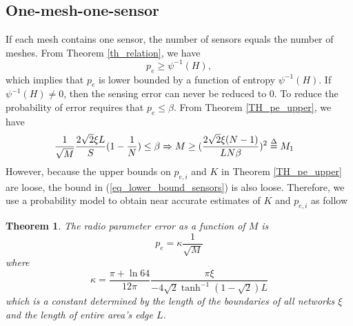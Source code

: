 \documentclass[conference]{IEEEtran}
\newtheorem{Theo}{Theorem}
\begin{document}
\subsection{One-mesh-one-sensor}
If each mesh contains one sensor, the number of sensors equals the number of meshes.
From Theorem \ref{th_relation}, we have
\begin{equation}
p_e \ge {\psi ^{ - 1}}(H),
\end{equation}
which implies that $p_e$ is lower bounded by a function of entropy ${\psi ^{ - 1}}(H)$.
If ${\psi ^{ - 1}}(H) \ne 0$, then the sensing error can never be reduced to $0$.
To reduce the probability of error requires that ${p_e} \le \beta$.
From Theorem \ref{TH_pe_upper}, we have
\begin{equation}\label{eq_lower_bound_sensors}
\begin{aligned}
 & \frac{1}{{\sqrt M }}\frac{{2\sqrt 2 \xi L}}{S}( {1 - \frac{1}{N}}) \le \beta  \Rightarrow M \ge ( {\frac{{2\sqrt 2 \xi (N - 1)}}{{L N\beta }}} )^2 \buildrel \Delta \over = {M_1}
\end{aligned}
\end{equation}
However, because the upper bounds on $p_{e,i}$ and $K$ in Theorem \ref{TH_pe_upper} are loose,
the bound in (\ref{eq_lower_bound_sensors}) is also loose.
Therefore, we use a probability model to obtain near accurate estimates of $K$ and $p_{e,i}$ as follow

\begin{Theo}
The radio parameter error as a function of $M$ is
\begin{equation}
{p_e} = \kappa \frac{1}{{\sqrt M }}
\end{equation}
where
\begin{equation}
\kappa = \frac{{\pi  + \ln 64}}{{12\pi }}\frac{{\pi \xi }}{{ - 4\sqrt 2 {{\tanh }^{ - 1}}(1 - \sqrt 2 )L}}
\end{equation}
which is a constant determined by the length of the boundaries of all networks $\xi$ and the length of entire area's edge $L$.
\end{Theo}
\end{document}
